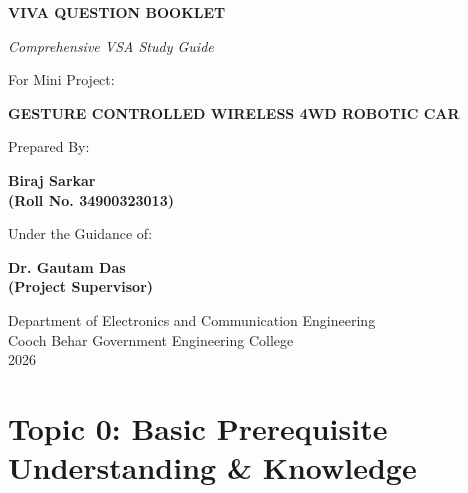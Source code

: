 \documentclass[12pt,a4paper,oneside]{report}
\begin{document}
\begin{titlepage}
\centering
{}
\vspace*{0.8in}
{\fontsize{26}{32}\selectfont\bfseries VIVA QUESTION BOOKLET\par}
\vspace{0.4in}
{\fontsize{18}{22}\selectfont\itshape Comprehensive VSA Study Guide\par}
\vspace{0.8in}
{\fontsize{16}{20}\selectfont For Mini Project:\par}
\vspace{0.2in}
{\fontsize{20}{26}\selectfont\bfseries GESTURE CONTROLLED WIRELESS 4WD ROBOTIC CAR\par}
\vfill
{\fontsize{14}{18}\selectfont Prepared By:\par}
{\fontsize{16}{20}\selectfont\bfseries Biraj Sarkar \\ (Roll No. 34900323013)\par}
\vspace{0.5in}
{\fontsize{14}{18}\selectfont Under the Guidance of:\par}
{\fontsize{16}{20}\selectfont\bfseries Dr. Gautam Das \\ (Project Supervisor)\par}
\vfill
{\fontsize{12}{16}\selectfont Department of Electronics and Communication Engineering \\ Cooch Behar Government Engineering College \\ 2026\par}
\end{titlepage}


\newpage
\begin{singlespace}
\begingroup
\titleformat{\chapter}[block]
  {\normalfont\fontsize{22}{26}\selectfont\bfseries\centering}
  {}{0pt}{}
\tableofcontents
\endgroup
\end{singlespace}
\clearpage


\chapter{Topic 0: Basic Prerequisite Understanding \& Knowledge}
\end{document}
